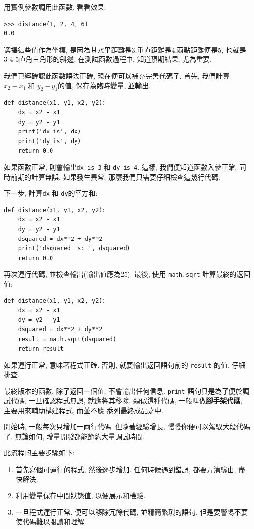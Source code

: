 \documentclass[10pt]{book}
\begin{document}
用實例參數調用此函數, 看看效果:

\begin{verbatim}
>>> distance(1, 2, 4, 6)
0.0
\end{verbatim}
%
選擇這些值作為坐標, 是因為其水平距離是3,垂直距離是4,兩點距離便是5, 
也就是3-4-5直角三角形的斜邊. 
在測試函數過程中, 知道預期結果, 尤為重要. 

我們已經確認此函數語法正確, 現在便可以補充完善代碼了. 
首先, 我們計算$x_2 - x_1$ 和 $y_2 - y_1$的值, 保存為臨時變量, 並輸出. 

\begin{verbatim}
def distance(x1, y1, x2, y2):
    dx = x2 - x1
    dy = y2 - y1
    print('dx is', dx)
    print('dy is', dy)
    return 0.0
\end{verbatim}
%
如果函數正常, 則會輸出\verb"dx is 3" 和 \verb"dy is 4". 
這樣, 我們便知道函數入參正確, 同時前期的計算無誤. 
如果發生異常, 那麼我們只需要仔細檢查這幾行代碼. 

下一步, 計算{\tt dx} 和 {\tt dy}的平方和:

\begin{verbatim}
def distance(x1, y1, x2, y2):
    dx = x2 - x1
    dy = y2 - y1
    dsquared = dx**2 + dy**2
    print('dsquared is: ', dsquared)
    return 0.0
\end{verbatim}
%
再次運行代碼, 並檢查輸出(輸出值應為25). 
最後, 使用 {\tt math.sqrt} 計算最終的返回值:

\begin{verbatim}
def distance(x1, y1, x2, y2):
    dx = x2 - x1
    dy = y2 - y1
    dsquared = dx**2 + dy**2
    result = math.sqrt(dsquared)
    return result
\end{verbatim}
%
如果運行正常, 意味著程式正確. 
否則, 就要輸出返回語句前的 {\tt result} 的值, 仔細排查. 

最終版本的函數, 除了返回一個值, 不會輸出任何信息. 
{\tt print} 語句只是為了便於調試代碼, 一旦確認程式無誤, 就應將其移除. 
類似這種代碼, 一般叫做{\bf 腳手架代碼},  主要用來輔助構建程式, 而並不應
忝列最終成品之中. 

開始時, 一般每次只增加一兩行代碼. 但隨著經驗增長, 慢慢你便可以駕馭大段代碼了. 
無論如何, 增量開發都能節約大量調試時間.

此流程的主要步驟如下:

\begin{enumerate}

\item 首先寫個可運行的程式, 然後逐步增加. 任何時候遇到錯誤, 都要弄清緣由, 盡快解決. 

\item 利用變量保存中間狀態值, 以便展示和檢驗. 

\item 一旦程式運行正常, 便可以移除冗餘代碼, 並精簡繁瑣的語句. 
但是要警惕不要使代碼難以閱讀和理解. 

\end{enumerate}
\end{document}
